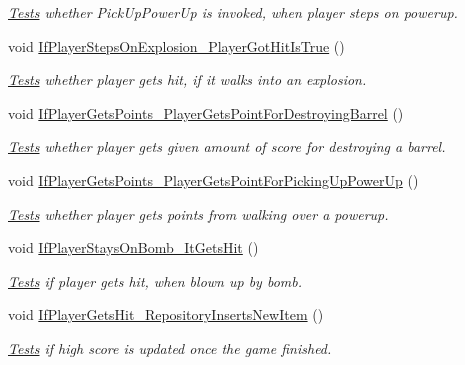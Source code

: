 \begin{DoxyCompactItemize}
\begin{DoxyCompactList}\small\item\em \mbox{\hyperlink{class_bomberman_1_1_business_logic_1_1_tests_1_1_tests}{Tests}} whether Pick\+Up\+Power\+Up is invoked, when player steps on powerup. \end{DoxyCompactList}\item 
void \mbox{\hyperlink{class_bomberman_1_1_business_logic_1_1_tests_1_1_tests_a743e17bb9043aca8465c90dbd98fdddd}{If\+Player\+Steps\+On\+Explosion\+\_\+\+Player\+Got\+Hit\+Is\+True}} ()
\begin{DoxyCompactList}\small\item\em \mbox{\hyperlink{class_bomberman_1_1_business_logic_1_1_tests_1_1_tests}{Tests}} whether player gets hit, if it walks into an explosion. \end{DoxyCompactList}\item 
void \mbox{\hyperlink{class_bomberman_1_1_business_logic_1_1_tests_1_1_tests_a092cbc583e8edacb6efab18c7b9695da}{If\+Player\+Gets\+Points\+\_\+\+Player\+Gets\+Point\+For\+Destroying\+Barrel}} ()
\begin{DoxyCompactList}\small\item\em \mbox{\hyperlink{class_bomberman_1_1_business_logic_1_1_tests_1_1_tests}{Tests}} whether player gets given amount of score for destroying a barrel. \end{DoxyCompactList}\item 
void \mbox{\hyperlink{class_bomberman_1_1_business_logic_1_1_tests_1_1_tests_ac733be2eb41411d749c2ab8ede811e3a}{If\+Player\+Gets\+Points\+\_\+\+Player\+Gets\+Point\+For\+Picking\+Up\+Power\+Up}} ()
\begin{DoxyCompactList}\small\item\em \mbox{\hyperlink{class_bomberman_1_1_business_logic_1_1_tests_1_1_tests}{Tests}} whether player gets points from walking over a powerup. \end{DoxyCompactList}\item 
void \mbox{\hyperlink{class_bomberman_1_1_business_logic_1_1_tests_1_1_tests_a7eee23b3b032beaa0213d7f7ed76eee4}{If\+Player\+Stays\+On\+Bomb\+\_\+\+It\+Gets\+Hit}} ()
\begin{DoxyCompactList}\small\item\em \mbox{\hyperlink{class_bomberman_1_1_business_logic_1_1_tests_1_1_tests}{Tests}} if player gets hit, when blown up by bomb. \end{DoxyCompactList}\item 
void \mbox{\hyperlink{class_bomberman_1_1_business_logic_1_1_tests_1_1_tests_a2f5d51f70042cad096c98bce366e48b9}{If\+Player\+Gets\+Hit\+\_\+\+Repository\+Inserts\+New\+Item}} ()
\begin{DoxyCompactList}\small\item\em \mbox{\hyperlink{class_bomberman_1_1_business_logic_1_1_tests_1_1_tests}{Tests}} if high score is updated once the game finished. \end{DoxyCompactList}\end{DoxyCompactItemize}

